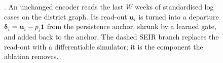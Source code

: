 \begin{figure}[t]
{}
\caption{\model{}. An unchanged encoder reads the last $W$ weeks of standardised log cases
on the district graph. Its read-out $\mathbf{u}_i$ is turned into a departure
$\boldsymbol{\delta}_i=\mathbf{u}_i-p_i\mathbf{1}$ from the persistence anchor, shrunk by
a learned gate, and added back to the anchor. The dashed SEIR branch replaces the
read-out with a differentiable simulator; it is the component the ablation removes.}
\label{fig:overview}
\end{figure}
